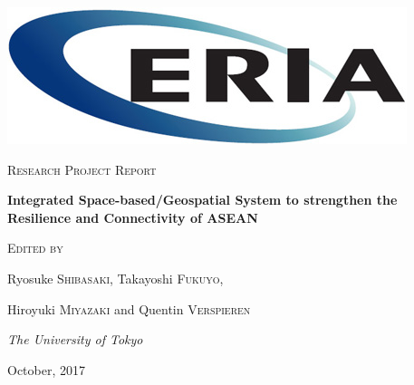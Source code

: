 \documentclass[10.5pt,listof=totoc]{report}
\begin{document}
\begin{CJK}{UTF8}{min}

\begin{titlepage}
	\centering
	\includegraphics[width=0.4\linewidth]{Figures/eria.jpg}\par
	\vspace{5 cm}
	{\scshape\large Research Project Report\par}
	\vspace{0.4cm}
	{\LARGE \bfseries Integrated Space-based/Geospatial System to strengthen the Resilience and Connectivity of ASEAN\par}
	\vspace{3 cm}
	{\scshape\large Edited by\par}
	\vspace{0.4cm}
	{\large Ryosuke \textsc{Shibasaki}, Takayoshi \textsc{Fukuyo},\par}
	{\large Hiroyuki \textsc{Miyazaki} and Quentin \textsc{Verspieren}\par}
	\vspace{0.2cm}
	{\large \itshape The University of Tokyo\par}
	\vfill
	{\large October, 2017\par}
\end{titlepage}




\cleardoublepage
{}


\cleardoublepage
{}


\cleardoublepage
{}


\tableofcontents

\cleardoublepage
{}
\listoffigures

\cleardoublepage
{}
\listoftables










\appendix




\singlespacing


\end{CJK}
\end{document}
